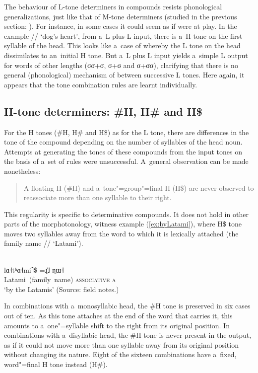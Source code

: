 The behaviour of L-tone determiners in compounds resists phonological generalizations, just like that of M-tone determiners (studied in the previous section: ). For instance, in some cases it could seem as if  were at play. In the
example // ‘dog’s heart’, from a~L plus L input, there is a~H tone on the first
syllable of the head. This looks like a~case of  whereby the L tone on the head
dissimilates to an~initial H tone. But a~L plus L input yields a~simple L output for words of other lengths (σσ+σ, σ+σ and σ+σσ), clarifying that there is no general (phonological) mechanism of  between successive L tones. Here again, it appears that the tone combination rules are learnt individually.


\subsection{H-tone determiners: \#H, H\# and H\$}
\label{sec:Htonedems}

For the H tones (\#H, H\# and H\$) as for the L tone, there are differences in the tone of the compound
depending on the number of syllables of the head noun. Attempts at generating the tones of these
compounds from the input tones on the basis of a~set of rules were unsuccessful. A~general
observation can be made nonetheless:

\begin{quotation}
A floating H (\#H) and a~tone"=group"=final H (H\$) are never observed to reassociate more than
one syllable to their right.
\end{quotation}

This regularity is specific to determinative compounds. It does not hold in other parts of the
morphotonology, witness example (\ref{ex:byLatami}), where H\$ tone moves two syllables away from
the word to which it is lexically attached (the family name // ‘Latami’).

\begin{exe}
	\ex
	\label{ex:byLatami}
	\\
	\gll lɑ˧tʰɑ˧mi˥\$		=ɻ̍˩		ɳɯ˧\\
	Latami~(family~name)	\textsc{associative}	\textsc{a}\\
	\glt ‘by the Latamis’ (Source: field notes.)
\end{exe}

In combinations with a~monosyllabic head, the \#H tone is preserved in six cases out of ten. As this
tone attaches at the end of the word that carries it, this amounts to a~one"=syllable shift to the
right from its original position. In combinations with a~disyllabic head, the \#H tone is never
present in the output, as if it could not move more than one syllable away from its original
position without changing its nature. Eight of the sixteen combinations have a~fixed,
word"=final H tone instead (H\#).

